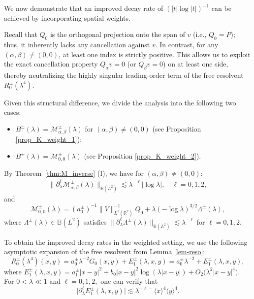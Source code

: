 \documentclass[reqno]{amsart}
\numberwithin{equation}{section}
\begin{document}
We now demonstrate that an improved decay rate of $(|t|\log|t|)^{-1}$ can be achieved by incorporating spatial weights.

Recall that $Q_0$ is the orthogonal projection onto the span of $v$ (i.e., $Q_0=P$); thus, it inherently lacks any cancellation against $v$. In contrast, for any  $(\alpha, \beta) \neq (0,0)$, at least one index is strictly positive. This allows us to exploit the exact cancellation property $Q_\alpha v = 0$ (or $Q_\beta v = 0$) on at least one side, thereby neutralizing the highly singular leading-order term of the free resolvent $R_0^\pm(\lambda^4)$.

Given this structural difference, we divide the analysis  into the following two cases:
\begin{itemize}
	\item[(I)] $B^\pm(\lambda)=\mathcal{M}_{\alpha,\beta}^\pm(\lambda)$ for $(\alpha,\beta)\neq(0,0)$ (see Proposition \ref{prop_K_weight_1});
	\item[(II)] $B^\pm(\lambda)=\mathcal{M}_{0,0}^\pm(\lambda)$ (see Proposition \ref{prop_K_weight_2}).
\end{itemize}

By  Theorem~\ref{thm:M_inverse} (I), we have for $(\alpha,\beta)\neq(0,0)$:
\begin{align}\label{Mneq00}
\bigl\|\partial_\lambda^\ell\mathcal{M}_{\alpha,\beta}^\pm(\lambda)\bigr\|_{\mathbb{B}(L^2)}
	\lesssim   \lambda^{-\ell}|\log \lambda|,  \quad  \ell = 0,1,2,
\end{align}
and
\begin{equation}\label{eq:M_00}
	\mathcal{M}_{0,0}^\pm(\lambda) =(a_0^\pm)^{-1} \|V\|_{L^1(\mathbb{R}^2)}^{-1}Q_0 + \lambda (-\log \lambda)^{3/2}\Lambda^{\pm}(\lambda),
\end{equation}		
where $\Lambda^{\pm}(\lambda) \in \mathbb{B}(L^2)$ satisfies
\(
\big\|\partial_\lambda^{\ell} \Lambda^{\pm}(\lambda) \big\|_{\mathbb{B}(L^2)} \lesssim \lambda^{-\ell}
\)
for $\ell = 0,1,2.$

To obtain the improved decay rates in the weighted setting, we use the following asymptotic expansion of the free resolvent from Lemma \ref{lem-reso}:
\begin{equation}\label{eq:expansion}
	R_0^{\pm}(\lambda^4)(x,y) = a_0^{\pm} \lambda^{-2}G_0(x,y) + E_1^{\pm}(\lambda,x,y)=a_0^{\pm} \lambda^{-2}+ E_1^{\pm}(\lambda,x,y),
\end{equation}
where  $
E_1^{\pm}(\lambda,x,y) = a_1^\pm |x-y|^2 + b_0 |x-y|^2 \log(\lambda |x-y|)
+ O_2\bigl(\lambda^{2}|x-y|^{4}\bigr).
$ For $0<\lambda\ll1$ and $\ell=0,1,2,$ one can verify that
\begin{equation}\label{derivative_1}
	\bigl| \partial_\lambda^\ell E_1^\pm(\lambda,x,y)\bigr| \lesssim \lambda^{-\ell-}\langle x \rangle^{4} \langle y \rangle^{4}.
\end{equation}
\end{document}
